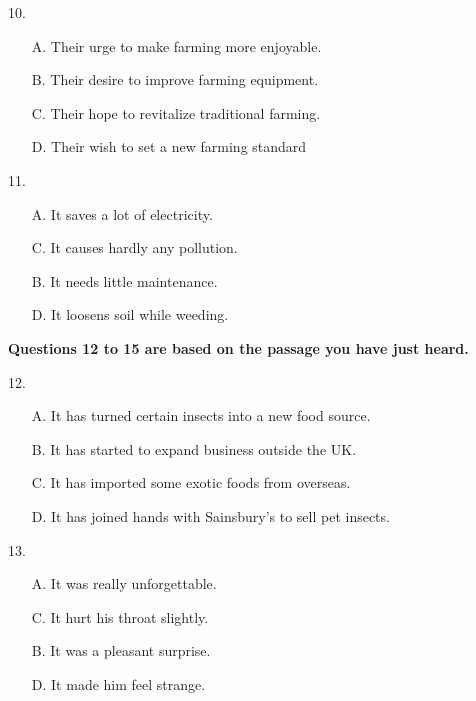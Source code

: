 \documentclass[UTF8,11pt]{ctexart}
\begin{document}
10.


\begin{itemize}[leftmargin=2em,itemsep=.2em,topsep=.4em]\item[A.] Their urge to make farming more enjoyable.
\item[B.] Their desire to improve farming equipment.
\item[C.] Their hope to revitalize traditional farming.
\item[D.] Their wish to set a new farming standard
\end{itemize}

11.


\begin{itemize}[leftmargin=2em,itemsep=.2em,topsep=.4em]\item[A.] It saves a lot of electricity.
\item[C.] It causes hardly any pollution.
\end{itemize}

\begin{itemize}[leftmargin=2em,itemsep=.2em,topsep=.4em]\item[B.] It needs little maintenance.
\item[D.] It loosens soil while weeding.
\end{itemize}

\textbf{Questions 12 to 15 are based on the passage you have just heard.}


12.


\begin{itemize}[leftmargin=2em,itemsep=.2em,topsep=.4em]\item[A.] It has turned certain insects into a new food source.
\item[B.] It has started to expand business outside the UK.
\item[C.] It has imported some exotic foods from overseas.
\item[D.] It has joined hands with Sainsbury's to sell pet insects.
\end{itemize}

13.


\begin{itemize}[leftmargin=2em,itemsep=.2em,topsep=.4em]\item[A.] It was really unforgettable.
\item[C.] It hurt his throat slightly.
\end{itemize}

\begin{itemize}[leftmargin=2em,itemsep=.2em,topsep=.4em]\item[B.] It was a pleasant surprise.
\item[D.] It made him feel strange.
\end{itemize}
\end{document}
